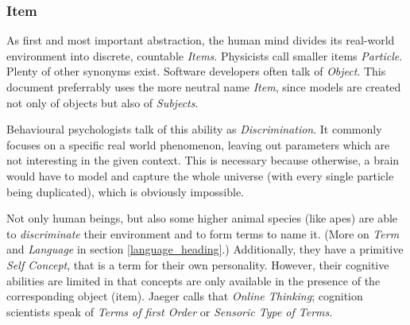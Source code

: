 %
%
%
%
%
%
%

\subsubsection{Item}
\label{item_heading}

As first and most important abstraction, the human mind divides its real-world
environment into discrete, countable \emph{Items}. Physicists call smaller
items \emph{Particle}. Plenty of other synonyms exist. Software developers
often talk of \emph{Object}. This document preferrably uses the more neutral
name \emph{Item}, since models are created not only of objects but also of
\emph{Subjects}.

Behavioural psychologists talk of this ability as \emph{Discrimination}. It
commonly focuses on a specific real world phenomenon, leaving out parameters
which are not interesting in the given context. This is necessary because
otherwise, a brain would have to model and capture the whole universe (with
every single particle being duplicated), which is obviously impossible.

Not only human beings, but also some higher animal species (like apes) are able
to \emph{discriminate} their environment and to form terms to name it.
(More on \emph{Term} and \emph{Language} in section \ref{language_heading}.)
Additionally, they have a primitive \emph{Self Concept}, that is a term for
their own personality. However, their cognitive abilities are limited in that
concepts are only available in the presence of the corresponding object (item).
Jaeger \cite{jaeger} calls that \emph{Online Thinking}; cognition scientists
speak of \emph{Terms of first Order} or \emph{Sensoric Type of Terms}.

